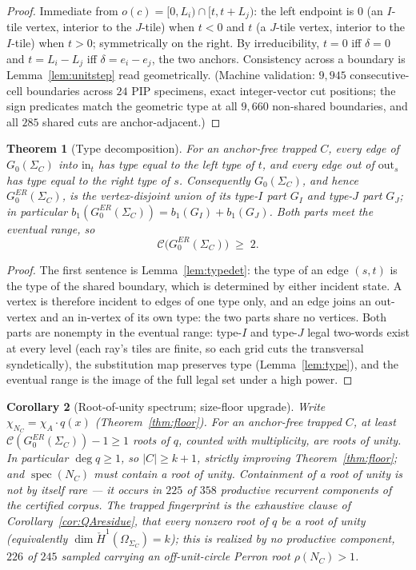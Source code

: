\documentclass[11pt]{article}
\newtheorem{theorem}{Theorem}[section]
\newtheorem{corollary}[theorem]{Corollary}
\begin{document}
\begin{proof}
Immediate from $o(c)=[0,L_i)\cap[t,t+L_j)$: the left endpoint is
$0$ (an $I$-tile vertex, interior to the $J$-tile) when $t<0$ and $t$
(a $J$-tile vertex, interior to the $I$-tile) when $t>0$; symmetrically
on the right. By irreducibility, $t=0$ iff $\delta=0$ and $t=L_i-L_j$
iff $\delta=e_i-e_j$, the two anchors. Consistency across a boundary is
Lemma~\ref{lem:unitstep} read geometrically. (Machine validation:
$9{,}945$ consecutive-cell boundaries across $24$ PIP specimens,
exact integer-vector cut positions; the sign predicates match the
geometric type at all $9{,}660$ non-shared boundaries, and all $285$
shared cuts are anchor-adjacent.)
\end{proof}

\begin{theorem}[Type decomposition]\label{thm:decomp}
For an anchor-free trapped $C$, every edge of $G_0(\Sigma_C)$ into
$\mathrm{in}_t$ has type equal to the left type of $t$, and every edge
out of $\mathrm{out}_s$ has type equal to the right type of $s$.
Consequently $G_0(\Sigma_C)$, and hence $G_0^{ER}(\Sigma_C)$, is the
\emph{vertex-disjoint} union of its type-$I$ part $G_I$ and type-$J$
part $G_J$; in particular $b_1(G_0^{ER}(\Sigma_C)) = b_1(G_I) +
b_1(G_J)$. Both parts meet the eventual range, so
\[
\mathcal C\bigl(G_0^{ER}(\Sigma_C)\bigr)\;\ge\;2 .
\]
\end{theorem}

\begin{proof}
The first sentence is Lemma~\ref{lem:typedet}: the type of an edge
$(s,t)$ is the type of the shared boundary, which is determined by
either incident state. A vertex is therefore incident to edges of one
type only, and an edge joins an out-vertex and an in-vertex of its own
type: the two parts share no vertices. Both parts are nonempty in the
eventual range: type-$I$ and type-$J$ legal two-words exist at every
level (each ray's tiles are finite, so each grid cuts the transversal
syndetically), the substitution map preserves type
(Lemma~\ref{lem:type}), and the eventual range is the image of the
full legal set under a high power.
\end{proof}

\begin{corollary}[Root-of-unity spectrum; size-floor upgrade]
\label{cor:rootofunity}
Write $\chi_{N_C}=\chi_A\cdot q(x)$ (Theorem~\ref{thm:floor}). For an
anchor-free trapped $C$, at least $\mathcal C(G_0^{ER}(\Sigma_C))-1\ge
1$ roots of $q$, counted with multiplicity, are roots of unity. In
particular $\deg q\ge1$, so $|C|\ge k+1$, strictly improving
Theorem~\ref{thm:floor}; and $\operatorname{spec}(N_C)$ must contain a
root of unity. Containment of \emph{a} root of unity is not by itself
rare --- it occurs in $225$ of $358$ productive recurrent components of
the certified corpus. The trapped fingerprint is the \emph{exhaustive}
clause of Corollary~\ref{cor:QAresidue}, that \emph{every} nonzero root
of $q$ be a root of unity (equivalently $\dim\check
H^1(\Omega_{\Sigma_C})=k$); this is realized by no productive
component, $226$ of $245$ sampled carrying an off-unit-circle Perron
root $\rho(N_C)>1$.
\end{corollary}
\end{document}

